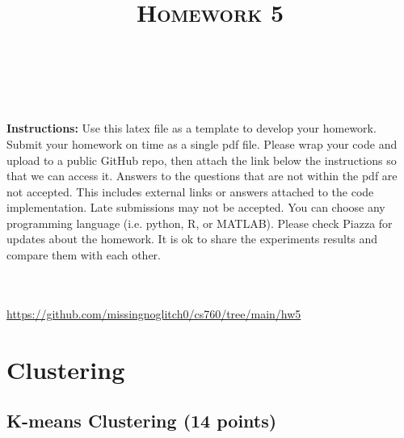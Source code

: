\documentclass[a4paper]{article}
\title{\textsc{Homework 5}} %
\author{
\red{$>>$Martin Diges$<<$} \\
\red{$>>$9080689699$<<$}\\
}
\date{}
\theoremstyle{definition}
\begin{document}
\maketitle 


\textbf{Instructions:}
Use this latex file as a template to develop your homework. Submit your homework on time as a single pdf file. Please wrap your code and upload to a public GitHub repo, then attach the link below the instructions so that we can access it. Answers to the questions that are not within the pdf are not accepted. This includes external links or answers attached to the code implementation. Late submissions may not be accepted. You can choose any programming language (i.e. python, R, or MATLAB). Please check Piazza for updates about the homework. It is ok to share the experiments results and compare them with each other.

\\\\
\hypersetup{colorlinks=true, linkcolor=cyan}
\url{https://github.com/missingnoglitch0/cs760/tree/main/hw5}

\vspace{0.1in}


\section{Clustering}

\subsection{K-means Clustering (14 points)}
\end{document}

